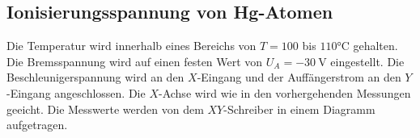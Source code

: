 \subsection{Ionisierungsspannung von Hg-Atomen}
Die Temperatur wird innerhalb eines Bereichs von $T=100$ bis $110\si{\degreeCelsius}$ gehalten.
Die Bremsspannung wird auf einen festen Wert von $U_A = \SI{-30}{\volt}$ eingestellt.
Die Beschleunigerspannung wird an den $X$-Eingang und der Auffängerstrom an den $Y$-Eingang angeschlossen.
Die $X$-Achse wird wie in den vorhergehenden Messungen geeicht.
Die Messwerte werden von dem $XY$-Schreiber in einem Diagramm aufgetragen.

